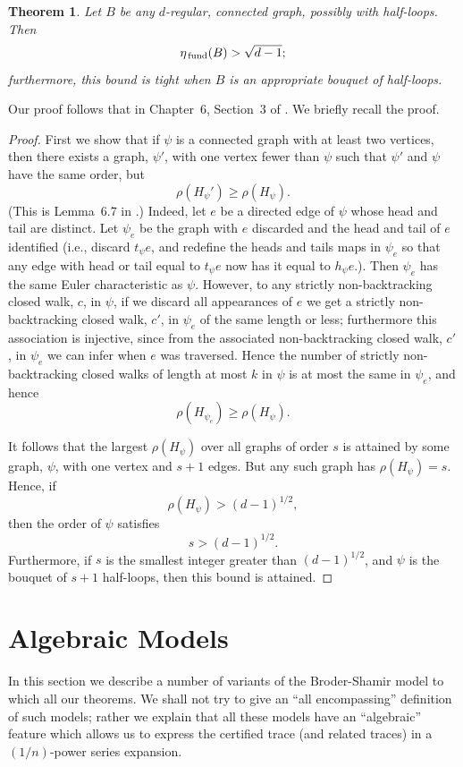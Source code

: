 \documentclass{memo-l}
\newcommand{\etafund}{{\eta_{\rm \,fund}}}
\theoremstyle{plain}
\newtheorem{theorem}{Theorem}[section]
\theoremstyle{definition}
\numberwithin{section}{chapter}
\numberwithin{equation}{chapter}
\theoremstyle{plain}
\theoremstyle{definition}
\begin{document}
\begin{theorem}
\label{th:fund_lower_bound}
Let $B$ be any $d$-regular, connected graph, possibly
with half-loops.  Then
$$
\etafund(B) > \sqrt{d-1};
$$
furthermore, this bound is tight when $B$ is an appropriate
bouquet of half-loops.
\end{theorem}
Our proof follows that in Chapter~6, Section~3 of \cite{friedman_alon}.
We briefly recall the proof.
\begin{proof}
First we show that if 
$\psi$ is a connected graph with at least two vertices, then 
there exists
a graph, $\psi'$, with one vertex fewer than $\psi$ such that
$\psi'$ and $\psi$ have the same order, but
$$
\rho(H_\psi') \ge \rho(H_\psi).
$$
(This is Lemma~6.7 in \cite{friedman_alon}.)
Indeed, let $e$ be a directed edge of $\psi$ whose head and tail are
distinct.
Let $\psi_e$ be the graph with $e$ discarded and the head and tail of
$e$ identified (i.e., discard $t_\psi e$, and redefine the heads and
tails maps in $\psi_e$ so that any edge with head or tail equal to
$t_\psi e$ now has it equal to $h_\psi e$.).
Then $\psi_e$ has the same Euler characteristic as $\psi$.
However, to any strictly non-backtracking closed walk, $c$, in $\psi$,
if we discard all appearances of $e$ we get
a strictly non-backtracking closed walk, $c'$, in $\psi_e$ of the same
length or less;
furthermore this association is injective, since from the 
associated non-backtracking closed walk, $c'$, in $\psi_e$ we can
infer when $e$ was traversed.
Hence the number of strictly non-backtracking closed walks of length at
most $k$
in $\psi$ is at most the same in $\psi_e$, and hence
$$
\rho(H_{\psi_e}) \ge \rho(H_\psi).
$$

It follows that the largest $\rho(H_\psi)$ over all graphs of order $s$
is attained by some graph, $\psi$, with one vertex and $s+1$ edges.
But any such graph has $\rho(H_\psi)=s$.
Hence, if
$$
\rho(H_\psi) > (d-1)^{1/2},
$$
then the order of $\psi$ satisfies
$$
s > (d-1)^{1/2}.
$$
Furthermore, if $s$ is the smallest integer greater than $(d-1)^{1/2}$,
and $\psi$ is the bouquet of $s+1$ half-loops, then this bound is attained.
\end{proof}




\section{Algebraic Models} 
\label{se:p2-algebraic}

In this section we describe a number of variants of the
Broder-Shamir model to which all our theorems.
We shall not try to give an ``all encompassing'' definition
of such models; rather we explain that all these models
have an ``algebraic'' feature which allows us to express
the certified trace (and related traces) in a $(1/n)$-power series
expansion.
\end{document}
